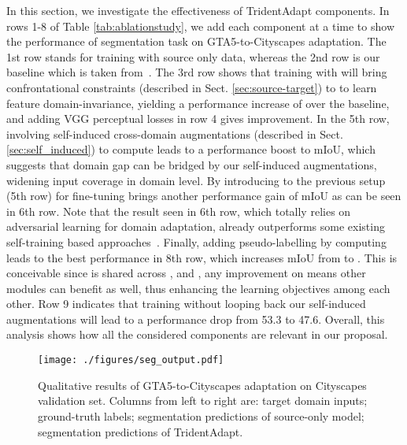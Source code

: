 \documentclass{bmvc2k}
\newcommand{\Sect}[1]{Sect. \ref{sec:#1}}
\newcommand{\Tab}[1]{Table \ref{tab:#1}}
\begin{document}
In this section, we investigate the effectiveness of TridentAdapt components. In rows 1-8 of \Tab{ablationstudy}, we add each component at a time to show the performance of segmentation task on GTA5-to-Cityscapes adaptation. The 1st row stands for training with source only data, whereas the 2nd row is our baseline which is taken from~\cite{tsai2018learning}. The 3rd row shows that training with  will bring confrontational constraints (described in \Sect{source-target}) to  to learn feature domain-invariance, yielding a performance increase of  over the baseline, and adding VGG perceptual losses in row 4 gives  improvement. In the 5th row, involving self-induced cross-domain augmentations (described in \Sect{self_induced}) to compute  leads to a performance boost to  mIoU, which suggests that domain gap can be bridged by our self-induced augmentations, widening input coverage in domain level. By introducing  to the previous setup (5th row) for fine-tuning  brings another performance gain of  mIoU as can be seen in 6th row. Note that the result seen in 6th row, which totally relies on adversarial learning for domain adaptation, already outperforms some existing self-training based approaches~\cite{choi2019self, du2019ssf, pan2020unsupervised, zou2018unsupervised}. Finally, adding pseudo-labelling by computing  leads to the best performance in 8th row, which increases mIoU from  to . This is conceivable since  is shared across ,  and , any improvement on  means other modules can benefit as well, thus enhancing the learning objectives among each other. Row 9 indicates that training without looping back our self-induced augmentations will lead to a performance drop from 53.3 to 47.6. Overall, this analysis shows how all the considered components are relevant in our proposal. 


\begin{figure}[htb!]
\centering
\texttt{[image: ./figures/seg\_output.pdf]}
\caption{ Qualitative results of GTA5-to-Cityscapes adaptation on Cityscapes validation set. Columns from left to right are: target domain inputs; ground-truth labels; segmentation predictions of source-only model;  segmentation predictions of TridentAdapt.}
\label{fig:seg_output}
\vspace{-3.5mm}
\end{figure}
\end{document}
